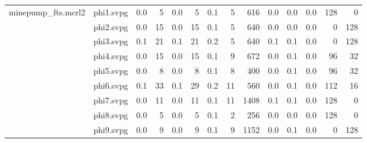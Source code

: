 \documentclass{standalone}
\begin{document}
\begin{tabular}{r r|r r|r r|r r r|r r r|r r}
minepump\_fts.mcrl2 & phi1.svpg                 & 0.0 & 5 & 0.0 & 5 & 0.1 & 5 & 616 & 0.0 & 0.0 & 0.0 & 128 & 0 \\
 & phi2.svpg                 & 0.0 & 15 & 0.0 & 15 & 0.1 & 5 & 640 & 0.0 & 0.0 & 0.0 & 0 & 128 \\
 & phi3.svpg                 & 0.1 & 21 & 0.1 & 21 & 0.2 & 5 & 640 & 0.1 & 0.1 & 0.0 & 0 & 128 \\
 & phi4.svpg                 & 0.0 & 15 & 0.0 & 15 & 0.1 & 9 & 672 & 0.0 & 0.1 & 0.0 & 96 & 32 \\
 & phi5.svpg                 & 0.0 & 8 & 0.0 & 8 & 0.1 & 8 & 400 & 0.0 & 0.1 & 0.0 & 96 & 32 \\
 & phi6.svpg                 & 0.1 & 33 & 0.1 & 29 & 0.2 & 11 & 560 & 0.0 & 0.1 & 0.0 & 112 & 16 \\
 & phi7.svpg                 & 0.0 & 11 & 0.0 & 11 & 0.1 & 11 & 1408 & 0.1 & 0.1 & 0.0 & 128 & 0 \\
 & phi8.svpg                 & 0.0 & 5 & 0.0 & 5 & 0.1 & 2 & 256 & 0.0 & 0.0 & 0.0 & 128 & 0 \\
 & phi9.svpg                 & 0.0 & 9 & 0.0 & 9 & 0.1 & 9 & 1152 & 0.0 & 0.1 & 0.0 & 0 & 128 \\
\end{tabular}
\end{document}
